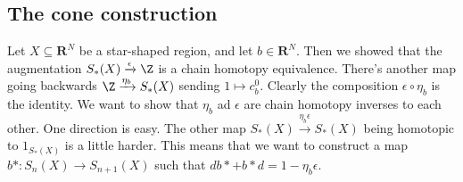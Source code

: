 \subsection{The cone construction}
Let $X\subseteq \mathbf{R}^N$ be a star-shaped region, and let $b\in\mathbf{R}^N$. Then we showed that the augmentation $S_\ast(X)\xrightarrow{\epsilon}\Z$ is a chain homotopy equivalence. There's another map going backwards $\Z\xrightarrow{\eta_b} S_\ast(X)$ sending $1\mapsto c^0_b$. Clearly the composition $\epsilon\circ\eta_b$ is the identity. We want to show that $\eta_b$ ad $\epsilon$ are chain homotopy inverses to each other. One direction is easy. The other map $S_\ast(X)\xrightarrow{\eta_b\epsilon}S_\ast(X)$ being homotopic to $1_{S_\ast(X)}$ is a little harder. This means that we want to construct a map $b\ast:S_n(X)\to S_{n+1}(X)$ such that $db\ast+b\ast d=1-\eta_b\epsilon$.

